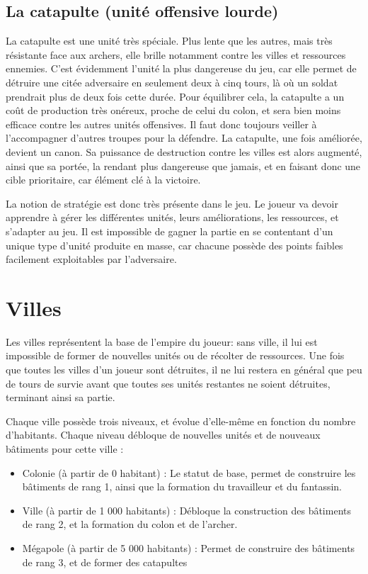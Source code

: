 \documentclass[12pt]{report}
\begin{document}
\subsection{La catapulte (unité offensive lourde)}

La catapulte est une unité très spéciale. Plus lente que les autres, mais très
résistante face aux archers, elle brille notamment contre les villes et
ressources ennemies. C’est évidemment l’unité la plus dangereuse du jeu, car
elle permet de détruire une citée adversaire en seulement deux à cinq tours, là
où un soldat prendrait plus de deux fois cette durée. Pour équilibrer cela, la
catapulte a un coût de production très onéreux, proche de celui du colon, et
sera bien moins efficace contre les autres unités offensives. Il faut donc
toujours veiller à l’accompagner d’autres troupes pour la défendre. La
catapulte, une fois améliorée, devient un canon. Sa puissance de destruction
contre les villes est alors augmenté, ainsi que sa portée, la rendant plus
dangereuse que jamais, et en faisant donc une cible prioritaire, car élément clé
à la victoire.

La notion de stratégie est donc très présente dans le jeu. Le joueur va devoir
apprendre à gérer les différentes unités, leurs améliorations, les ressources,
et s’adapter au jeu. Il est impossible de gagner la partie en se contentant d’un
unique type d’unité produite en masse, car chacune possède des points faibles
facilement exploitables par l’adversaire.

\section{Villes}

Les villes représentent la base de l’empire du joueur: sans ville, il lui est
impossible de former de nouvelles unités ou de récolter de ressources. Une fois
que toutes les villes d’un joueur sont détruites, il ne lui restera en général
que peu de tours de survie avant que toutes ses unités restantes ne soient
détruites, terminant ainsi sa partie.

Chaque ville possède trois niveaux, et évolue d’elle-même en fonction du nombre
d’habitants. Chaque niveau débloque de nouvelles unités et de nouveaux bâtiments
pour cette ville :

\begin{itemize}
    \item Colonie (à partir de 0 habitant) : Le statut de base, permet de
        construire les bâtiments de rang 1, ainsi que la formation du
        travailleur et du fantassin.
    \item Ville (à partir de 1 000 habitants) : Débloque la construction des
        bâtiments de rang 2, et la formation du colon et de l’archer.
    \item Mégapole (à partir de 5 000 habitants) : Permet de construire des
        bâtiments de rang 3, et de former des catapultes
\end{itemize}
\end{document}
